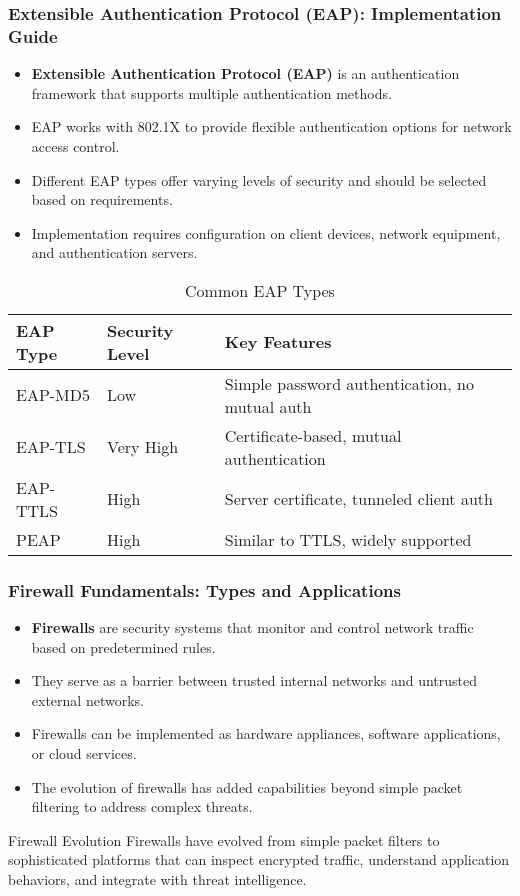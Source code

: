 \documentclass{beamer}
\begin{document}
\begin{frame}
    \frametitle{Extensible Authentication Protocol (EAP): Implementation Guide}
    \begin{itemize}
        \item \textbf{Extensible Authentication Protocol (EAP)} is an authentication framework that supports multiple authentication methods.
        \item EAP works with 802.1X to provide flexible authentication options for network access control.
        \item Different EAP types offer varying levels of security and should be selected based on requirements.
        \item Implementation requires configuration on client devices, network equipment, and authentication servers.
    \end{itemize}

    \small
    \begin{table}
        \centering
        \begin{tabular}{|l|l|l|}
            \hline
            \textbf{EAP Type} & \textbf{Security Level} & \textbf{Key Features} \\
            \hline
            EAP-MD5 & Low & Simple password authentication, no mutual auth \\
            \hline
            EAP-TLS & Very High & Certificate-based, mutual authentication \\
            \hline
            EAP-TTLS & High & Server certificate, tunneled client auth \\
            \hline
            PEAP & High & Similar to TTLS, widely supported \\
            \hline
        \end{tabular}
        \caption{Common EAP Types}
    \end{table}
\end{frame}

\begin{frame}
    \frametitle{Firewall Fundamentals: Types and Applications}
    \begin{itemize}
        \item \textbf{Firewalls} are security systems that monitor and control network traffic based on predetermined rules.
        \item They serve as a barrier between trusted internal networks and untrusted external networks.
        \item Firewalls can be implemented as hardware appliances, software applications, or cloud services.
        \item The evolution of firewalls has added capabilities beyond simple packet filtering to address complex threats.
    \end{itemize}
    
    \begin{alertblock}{Firewall Evolution}
        Firewalls have evolved from simple packet filters to sophisticated platforms that can inspect encrypted traffic, understand application behaviors, and integrate with threat intelligence.
    \end{alertblock}
\end{frame}
\end{document}
